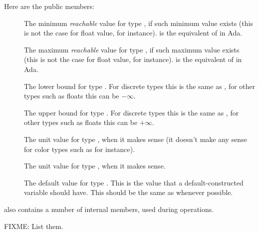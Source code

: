 Here are the public  members:

\begin{description}
\item[]
  The minimum \emph{reachable} value for type , if such minimum value
  exists (this is not the case for float value, for instance).
   is the equivalent of  in Ada.
\item[]
  The maximum \emph{reachable} value for type , if such maximum value
  exists (this is not the case for float value, for instance).
   is the equivalent of  in Ada.
\item[]
  The lower bound for type .  For discrete types this is the
  same as , for other types such as floats this can
  be $-\infty$.
\item[]
  The upper bound for type .  For discrete types this is the
  same as , for other types such as floats this can
  be $+\infty$.
\item[]
  The unit value for type , when it makes sense (it doesn't
  make any sense for color types such as  for instance).
\item[]
  The unit value for type , when it makes sense.
\item[]
  The default value for type .  This is the value that a
  default-constructed  variable should have.  This should
  be the same as  whenever possible.
\end{description}

 also contains a number of internal members, used
during operations.

FIXME: List them.
